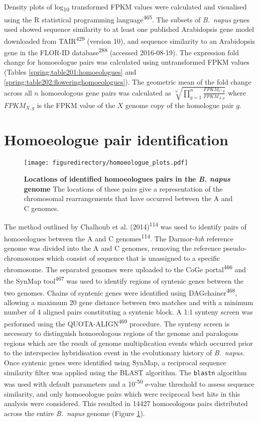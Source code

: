 \documentclass[12pt,]{book}
\begin{document}
Density plots of log\textsubscript{10} transformed FPKM values were
calculated and visualised using the R statistical programming
language\textsuperscript{465}. The subsets of \emph{B.~napus} genes used
showed sequence similarity to at least one published Arabidopsis gene
model downloaded from TAIR\textsuperscript{429} (version 10), and
sequence similarity to an Arabidopsis gene in the FLOR-ID
database\textsuperscript{288} (accessed 2016-08-19). The expression fold
change for homoeologue pairs was calculated using untransformed FPKM
values (Tables \ref{spring:table201:homoeologues} and
\ref{spring:table202:floweringhomoeologues}). The geometric mean of the
fold change across all \(n\) homoeologous gene pairs was calculated as
\(\sqrt[n]{\prod_{g=1}^{n} \frac{\mathit{FPKM}_{C,g}}{\mathit{FPKM}_{A,g}}}\)
where \(\mathit{FPKM}_{X,g}\) is the FPKM value of the \(X\) genome copy
of the homologue pair \(g\).

\section{Homoeologue pair
identification}\label{homoeologue-pair-identification}

\begin{figure}[htbp]
\centering
\texttt{[image: figuredirectory/homoeologue\_plots.pdf]}
\caption{\textbf{Locations of identified homoeologues pairs in the
\emph{B. napus} genome} The locations of these pairs give a
representation of the chromosomal rearrangements that have occurred
between the A and C genomes.}\label{figure:methods:homoeologue}
\end{figure}

The method outlined by Chalhoub et al. (2014)\textsuperscript{114} was
used to identify pairs of homoeologues between the A and C
genomes\textsuperscript{114}. The Darmor-\emph{bzh} reference genome was
divided into the A and C genomes, removing the reference
pseudo-chromosomes which consist of sequence that is unassigned to a
specific chromosome. The separated genomes were uploaded to the CoGe
portal\textsuperscript{466} and the SynMap tool\textsuperscript{467} was
used to identify regions of syntenic genes between the two genomes.
Chains of syntenic genes were identified using
DAGchainer\textsuperscript{468}, allowing a maximum 20 gene distance
between two matches and with a minimum number of 4 aligned pairs
constituting a syntenic block. A 1:1 synteny screen was performed using
the QUOTA-ALIGN\textsuperscript{469} procedure. The synteny screen is
necessary to distinguish homoeologous regions of the genome and
paralogous regions which are the result of genome multiplication events
which occurred prior to the interspecies hybridisation event in the
evolutionary history of \emph{B.~napus}. Once syntenic genes were
identified using SynMap, a reciprocal sequence similarity filter was
applied using the BLAST algorithm. The \texttt{blastn} algorithm was
used with default parameters and a 10\textsuperscript{-50} e-value
threshold to assess sequence similarity, and only homoeologue pairs
which were reciprocal best hits in this analysis were considered. This
resulted in 14427 homoeologous pairs distributed across the entire
\emph{B.~napus} genome (Figure \ref{figure:methods:homoeologue}).
\end{document}
